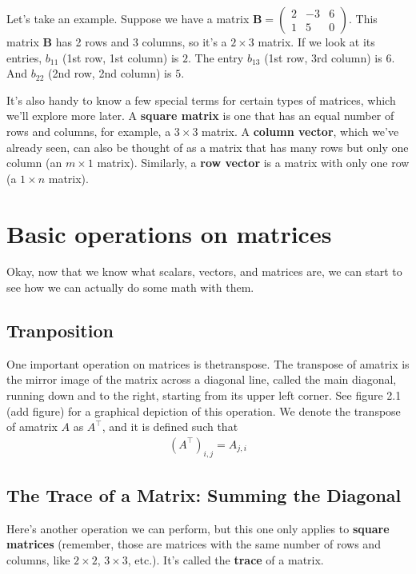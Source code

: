 \documentclass[11pt]{article}
\begin{document}
Let's take an example. Suppose we have a matrix $\mathbf{B} = \begin{pmatrix} 2 & -3 & 6 \\ 1 & 5 & 0 \end{pmatrix}$. This matrix $\mathbf{B}$ has 2 rows and 3 columns, so it's a $2 \times 3$ matrix. If we look at its entries, $b_{11}$ (1st row, 1st column) is $2$. The entry $b_{13}$ (1st row, 3rd column) is $6$. And $b_{22}$ (2nd row, 2nd column) is $5$.

It's also handy to know a few special terms for certain types of matrices, which we'll explore more later. A \textbf{square matrix} is one that has an equal number of rows and columns, for example, a $3 \times 3$ matrix. A \textbf{column vector}, which we've already seen, can also be thought of as a matrix that has many rows but only one column (an $m \times 1$ matrix). Similarly, a \textbf{row vector} is a matrix with only one row (a $1 \times n$ matrix).

\section{Basic operations on matrices}

Okay, now that we know what scalars, vectors, and matrices are, we can start to see how we can actually do some math with them.

\subsection{Tranposition}
One important operation on matrices is thetranspose. The transpose of amatrix is the mirror image of the matrix across a diagonal line, called the main diagonal, running down and to the right, starting from its upper left corner. See figure 2.1 (add figure) for a graphical depiction of this operation. We denote the transpose of amatrix $A$ as $A^\intercal$, and it is deﬁned such that
\begin{align*}
    (A^\intercal)_{i,j} = A_{j, i}
\end{align*}

\subsection{The Trace of a Matrix: Summing the Diagonal}

Here's another operation we can perform, but this one only applies to \textbf{square matrices} (remember, those are matrices with the same number of rows and columns, like $2 \times 2$, $3 \times 3$, etc.). It's called the \textbf{trace} of a matrix.
\end{document}
